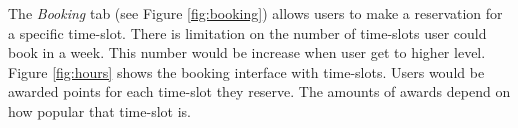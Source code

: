 The \emph{Booking} tab (see Figure \ref{fig:booking}) allows users to make a reservation for a specific time-slot. There is limitation on the number of time-slots user could book in a week. This number would be increase when user get to higher level. Figure \ref{fig:hours} shows the booking interface with time-slots. Users would be awarded points for each time-slot they reserve. The amounts of awards depend on how popular that time-slot is.
\begin{figure}%
    \centering

\end{figure}
